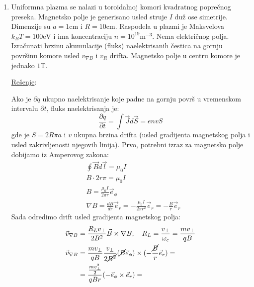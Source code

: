 \documentclass[fleqn]{report}
\begin{document}
\begin{enumerate}
          \hrulefill
    \item Uniformna plazma se nalazi u toroidalnoj komori kvadratnog poprečnog preseka.
          Magnetsko polje je generisano usled struje $I$ duž ose simetrije.
          Dimenzije su $a = 1\si{\centi\meter}$ i $R = 10\si{\centi\meter}$.
          Raspodela u plazmi je Maksvelova $k_B T = 100\si{\electronvolt}$ i ima koncentraciju $n = 10^{19}\si{\meter^{-3}}$.
          Nema električnog polja.
          Izračunati brzinu akumulacije (fluks) naelektrisanih čestica na gornju površinu komore usled $v_{\nabla B}$ i $v_R$ drifta.
          Magnetsko polje u centru komore je jednako $1\si{\tesla}$.

          \underline{Rešenje}:

          Ako je $\partial q$ ukupno naelektrisanje koje padne na gornju površ u vremenskom intervalu $\partial t$, fluks naelektrisanja je:
          \[ \frac{\partial q}{\partial t} = \int \vec{J}d\vec{S} = envS \]
          gde je $S = 2R\pi a$ i $v$ ukupna brzina drifta (usled gradijenta magnetskog polja i usled zakrivljenosti njegovih linija).
          Prvo, potrebni izraz za magnetsko polje dobijamo iz Amperovog zakona:
          \begin{align*}
               & \oint \vec{B} d\vec{l} = \mu_0 I                                                                  \\
               & B \cdot 2r\pi = \mu_0 I                                                                           \\
               & B = \frac{\mu_0 I}{2\pi r} \vec{e}_\phi                                                           \\
               & \nabla B = \frac{dB}{dr} \vec{e}_r = -\frac{\mu_0 I}{2\pi r^2} \vec{e}_r = -\frac{B}{r} \vec{e}_r
          \end{align*}
          Sada odredimo drift usled gradijenta magnetskog polja:
          \begin{align*}
              \vec{v}_{\nabla B} & = \frac{R_L v_\perp}{2B^2} \vec{B} \times \nabla B; \quad R_L = \frac{v_\perp}{\omega_c} = \frac{m v_\perp}{qB}        \\
              \vec{v}_{\nabla B} & = \frac{m v_\perp}{qB} \frac{v_\perp}{2\cancel{B^2}} (\cancel{B} \vec{e}_\phi)\times(-\frac{\cancel{B}}{r}\vec{e}_r) = \\
                                 & = \frac{\frac{m v_\perp^2}{2}}{qBr} (-\vec{e}_\phi \times \vec{e}_r) =                                                 \\

\end{align*}
\end{enumerate}
\end{document}
